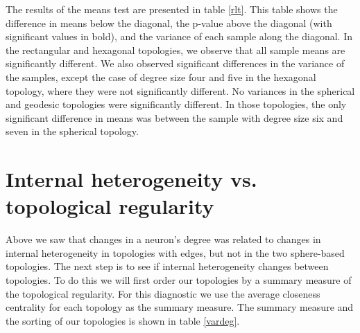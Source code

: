\begin{table}[htb]
\begin{minipage}{\textwidth}
\end{minipage}\end{table}

The results of the means test are presented in table \ref{rlt}. This table
shows the difference in means below the diagonal, the p-value above the
diagonal (with significant values in bold), and the variance of each
sample along the diagonal.  In the rectangular and hexagonal topologies, we
observe that all sample means are significantly different.  We also observed
significant differences in the variance of the samples, except the case of
degree size four and five in the hexagonal topology, where they were not
significantly different. No variances in the spherical and geodesic topologies
were significantly different.  In those topologies, the only significant
difference in means was between the sample with degree size six and seven in
the spherical topology.





\section{Internal heterogeneity vs. topological regularity}
\label{rdq2}
Above we saw that changes in a neuron's degree was related to changes in
internal heterogeneity in topologies with edges, but not in the two sphere-based
topologies. The next step is to see if internal heterogeneity changes between
topologies.  To do this we will first order our topologies by a summary
measure of the topological regularity.  For this diagnostic we use the average
closeness centrality for each topology as the summary measure.  The summary
measure and the sorting of our topologies is shown in table \ref{vardeg}.

